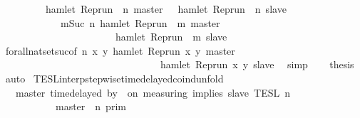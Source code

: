 \begin{isabellebody}
\ \ \ \ \ \ \ {\isacharequal}\ {\isacharbraceleft}{\isasymrho}{\isachardot}\ hamlet\ {\isacharparenleft}{\isacharparenleft}Rep{\isacharunderscore}run\ {\isasymrho}{\isacharparenright}\ n\ master{\isacharparenright}\ {\isasymlongrightarrow}\ {\isasymnot}\ hamlet\ {\isacharparenleft}{\isacharparenleft}Rep{\isacharunderscore}run\ {\isasymrho}{\isacharparenright}\ n\ slave{\isacharparenright}{\isacharbraceright}\isanewline
\ \ \ \ \ \ \ \ \ \ {\isasyminter}\ {\isacharbraceleft}{\isasymrho}{\isachardot}\ {\isasymforall}m{\isasymge}Suc\ n{\isachardot}\ hamlet\ {\isacharparenleft}{\isacharparenleft}Rep{\isacharunderscore}run\ {\isasymrho}{\isacharparenright}\ m\ master{\isacharparenright}\isanewline
\ \ \ \ \ \ \ \ \ \ \ \ \ \ \ \ \ \ \ \ \ {\isasymlongrightarrow}\ {\isasymnot}\ hamlet\ {\isacharparenleft}{\isacharparenleft}Rep{\isacharunderscore}run\ {\isasymrho}{\isacharparenright}\ m\ slave{\isacharparenright}{\isacharbraceright}{\isacartoucheclose}\isanewline
\ \ \ \ \isamarkupfalse%
\ forall{\isacharunderscore}nat{\isacharunderscore}set{\isacharunderscore}suc{\isacharbrackleft}of\ {\isacartoucheopen}n{\isacartoucheclose}\ {\isacartoucheopen}{\isasymlambda}x\ y{\isachardot}\ hamlet\ {\isacharparenleft}{\isacharparenleft}Rep{\isacharunderscore}run\ x{\isacharparenright}\ y\ master{\isacharparenright}\isanewline
\ \ \ \ \ \ \ \ \ \ \ \ \ \ \ \ \ \ \ \ \ \ \ \ \ \ \ \ \ \ \ {\isasymlongrightarrow}\ {\isasymnot}hamlet\ {\isacharparenleft}{\isacharparenleft}Rep{\isacharunderscore}run\ x{\isacharparenright}\ y\ slave{\isacharparenright}{\isacartoucheclose}{\isacharbrackright}\ \isamarkupfalse%
\ simp\isanewline
\ \ \isamarkupfalse%
\ {\isacharquery}thesis\ \isamarkupfalse%
\ auto\isanewline
{}\isamarkupfalse%
%
\endisatagproof
{\isafoldproof}%
%
\isadelimproof
\isanewline
%
\endisadelimproof
\isanewline
{}\isamarkupfalse%
\ TESL{\isacharunderscore}interp{\isacharunderscore}stepwise{\isacharunderscore}timedelayed{\isacharunderscore}coind{\isacharunderscore}unfold{\isacharcolon}\isanewline
\ \ {\isacartoucheopen}{\isasymlbrakk}\ master\ time{\isacharminus}delayed\ by\ {\isasymdelta}{\isasymtau}\ on\ measuring\ implies\ slave\ {\isasymrbrakk}\isactrlsub T\isactrlsub E\isactrlsub S\isactrlsub L\isactrlbsup {\isasymge}\ n\isactrlesup \ {\isacharequal}\isanewline
\ \ \ \ \ {\isacharparenleft}\ \ \ \ \ {\isasymlbrakk}\ master\ {\isasymnot}{\isasymUp}\ n\ {\isasymrbrakk}\isactrlsub p\isactrlsub r\isactrlsub i\isactrlsub m\ \ \ \ \ \ \ \ \ \ \ \ \ \ \ %
\end{isabellebody}
